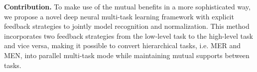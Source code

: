 \textbf{Contribution.}
To make use of the mutual benefits in a more sophisticated way, we propose a novel deep neural multi-task learning framework with explicit feedback strategies to jointly model recognition and normalization. This method incorporates two feedback strategies from the low-level task to the high-level task and vice versa, making it possible to convert hierarchical tasks, i.e. MER and MEN, into parallel multi-task mode while maintaining mutual supports between tasks.
